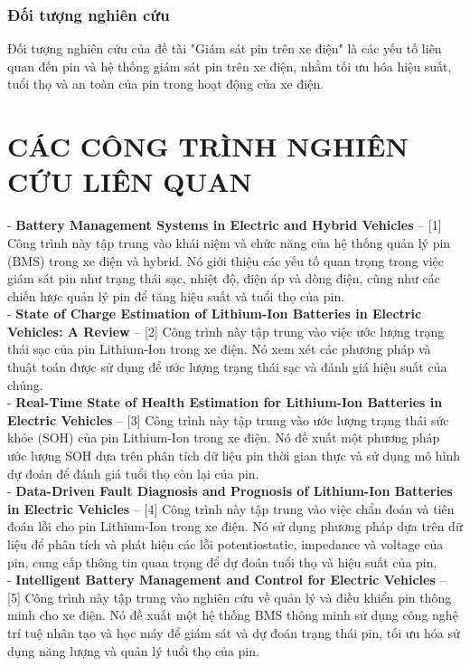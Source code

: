 \documentclass[a4paper,13pt]{article}
\theoremstyle{mytheor}
\begin{document}
\subsubsection{Đối tượng nghiên cứu }
Đối tượng nghiên cứu của đề tài "Giám sát pin trên xe điện" là các yếu tố liên quan đến pin và hệ thống giám sát pin trên xe điện, nhằm tối ưu hóa hiệu suất, tuổi thọ và an toàn của pin trong hoạt động của xe điện.

\section{CÁC CÔNG TRÌNH NGHIÊN CỨU LIÊN QUAN }
- \textbf{Battery Management Systems in Electric and Hybrid Vehicles} – [1] Công trình này tập trung vào khái niệm và chức năng của hệ thống quản lý pin (BMS) trong xe điện và hybrid. Nó giới thiệu các yếu tố quan trọng trong việc giám sát pin như trạng thái sạc, nhiệt độ, điện áp và dòng điện, cũng như các chiến lược quản lý pin để tăng hiệu suất và tuổi thọ của pin.\\

- \textbf{State of Charge Estimation of Lithium-Ion Batteries in Electric Vehicles: A Review} – [2] Công trình này tập trung vào việc ước lượng trạng thái sạc của pin Lithium-Ion trong xe điện. Nó xem xét các phương pháp và thuật toán được sử dụng để ước lượng trạng thái sạc và đánh giá hiệu suất của chúng.\\

- \textbf{Real-Time State of Health Estimation for Lithium-Ion Batteries in Electric Vehicles} – [3] Công trình này tập trung vào ước lượng trạng thái sức khỏe (SOH) của pin Lithium-Ion trong xe điện. Nó đề xuất một phương pháp ước lượng SOH dựa trên phân tích dữ liệu pin thời gian thực và sử dụng mô hình dự đoán để đánh giá tuổi thọ còn lại của pin.\\

- \textbf{Data-Driven Fault Diagnosis and Prognosis of Lithium-Ion Batteries in Electric Vehicles} – [4] Công trình này tập trung vào việc chẩn đoán và tiên đoán lỗi cho pin Lithium-Ion trong xe điện. Nó sử dụng phương pháp dựa trên dữ liệu để phân tích và phát hiện các lỗi potentiostatic, impedance và voltage của pin, cung cấp thông tin quan trọng để dự đoán tuổi thọ và hiệu suất của pin.\\

- \textbf{Intelligent Battery Management and Control for Electric Vehicles} – [5] Công trình này tập trung vào nghiên cứu về quản lý và điều khiển pin thông minh cho xe điện. Nó đề xuất một hệ thống BMS thông minh sử dụng công nghệ trí tuệ nhân tạo và học máy để giám sát và dự đoán trạng thái pin, tối ưu hóa sử dụng năng lượng và quản lý tuổi thọ của pin.\\
\end{document}
